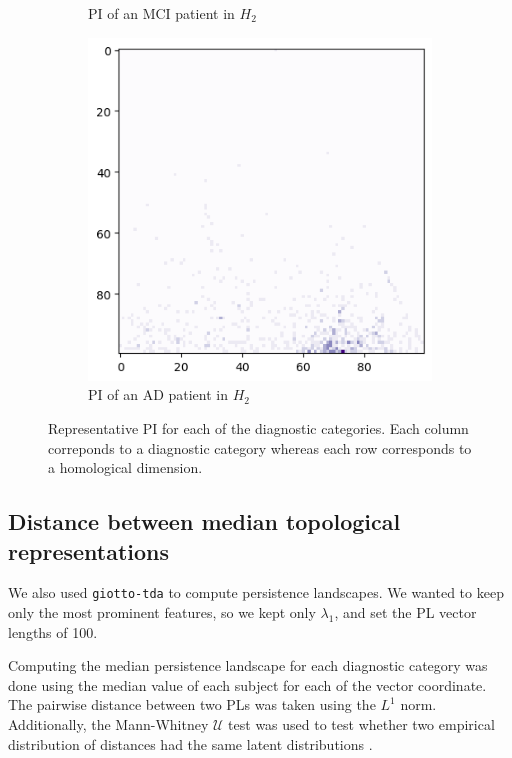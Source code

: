 \documentclass{article}
\begin{document}
\begin{figure}
\begin{subfigure}{0.32\textwidth}
    \caption{PI of an MCI patient in $H_2$}
  \end{subfigure}
  \begin{subfigure}{0.32\textwidth}
    \includegraphics[width=\textwidth]{figures/PIs/Persistence_image_AD_h_2.png}
    \caption{PI of an AD patient in $H_2$}
  \end{subfigure}
  \caption{Representative PI for each of the diagnostic categories. Each column correponds to a
    diagnostic category whereas each row corresponds to a homological dimension.}
  \label{fig:sample_rep_pi}
\end{figure}

\subsection{Distance between median topological representations}

We also used \texttt{giotto-tda} to compute persistence landscapes. We wanted to keep only the most
prominent features, so we kept only $\lambda_1$, and set the PL vector lengths of 100.

Computing the median persistence landscape for each diagnostic category was done using the median
value of each subject for each of the vector coordinate. The pairwise distance between two PLs was
taken using the $L^1$ norm. Additionally, the Mann-Whitney $\mathcal{U}$ test
was used to test whether two empirical distribution of distances had the same
latent distributions \citep{mann1947test}. 
\end{document}
